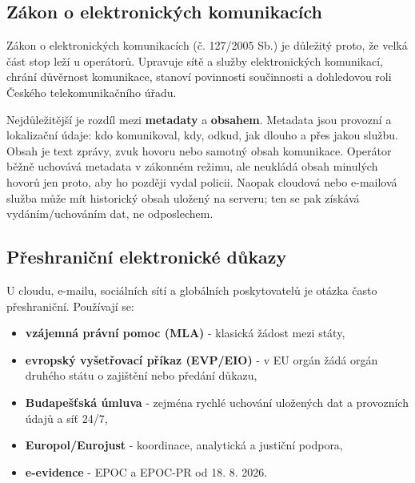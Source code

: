 
\subsection*{Zákon o elektronických komunikacích}
Zákon o elektronických komunikacích (č. 127/2005 Sb.) je důležitý proto, že velká část stop leží u operátorů. Upravuje sítě a služby elektronických komunikací, chrání důvěrnost komunikace, stanoví povinnosti součinnosti a dohledovou roli Českého telekomunikačního úřadu.

Nejdůležitější je rozdíl mezi \textbf{metadaty} a \textbf{obsahem}. Metadata jsou provozní a lokalizační údaje: kdo komunikoval, kdy, odkud, jak dlouho a přes jakou službu. Obsah je text zprávy, zvuk hovoru nebo samotný obsah komunikace. Operátor běžně uchovává metadata v zákonném režimu, ale neukládá obsah minulých hovorů jen proto, aby ho později vydal policii. Naopak cloudová nebo e-mailová služba může mít historický obsah uložený na serveru; ten se pak získává vydáním/uchováním dat, ne odposlechem.



\subsection*{Přeshraniční elektronické důkazy}
U cloudu, e-mailu, sociálních sítí a globálních poskytovatelů je otázka často přeshraniční. Používají se:
\begin{itemize}
  \item \textbf{vzájemná právní pomoc (MLA)} - klasická žádost mezi státy,
  \item \textbf{evropský vyšetřovací příkaz (EVP/EIO)} - v EU orgán žádá orgán druhého státu o zajištění nebo předání důkazu,
  \item \textbf{Budapešťská úmluva} - zejména rychlé uchování uložených dat a provozních údajů a síť 24/7,
  \item \textbf{Europol/Eurojust} - koordinace, analytická a justiční podpora,
  \item \textbf{e-evidence} - EPOC a EPOC-PR od 18. 8. 2026.
\end{itemize}

